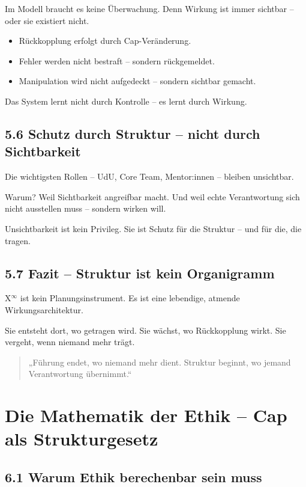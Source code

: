 \documentclass[12pt,a4paper]{book}
\begin{document}
Im Modell braucht es keine Überwachung.  
Denn Wirkung ist immer sichtbar – oder sie existiert nicht.

\begin{itemize}
    \item Rückkopplung erfolgt durch Cap-Veränderung.
    \item Fehler werden nicht bestraft – sondern rückgemeldet.
    \item Manipulation wird nicht aufgedeckt – sondern sichtbar gemacht.
\end{itemize}

Das System lernt nicht durch Kontrolle –  
es lernt durch Wirkung.

\section*{5.6 Schutz durch Struktur – nicht durch Sichtbarkeit}

Die wichtigsten Rollen – UdU, Core Team, Mentor:innen – bleiben unsichtbar.

Warum?  
Weil Sichtbarkeit angreifbar macht.  
Und weil echte Verantwortung sich nicht ausstellen muss – sondern wirken will.

Unsichtbarkeit ist kein Privileg.  
Sie ist Schutz für die Struktur – und für die, die tragen.

\section*{5.7 Fazit – Struktur ist kein Organigramm}

X$^\infty$ ist kein Planungsinstrument.  
Es ist eine lebendige, atmende Wirkungsarchitektur.

Sie entsteht dort, wo getragen wird.  
Sie wächst, wo Rückkopplung wirkt.  
Sie vergeht, wenn niemand mehr trägt.

\begin{quote}
„Führung endet, wo niemand mehr dient.  
Struktur beginnt, wo jemand Verantwortung übernimmt.“  
\end{quote}

\chapter{Die Mathematik der Ethik – Cap als Strukturgesetz}

\section*{6.1 Warum Ethik berechenbar sein muss}
\end{document}
